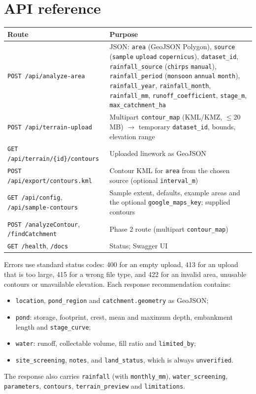 \documentclass[11pt,a4paper]{article}
\newcommand{\code}[1]{\texttt{#1}}
\begin{document}
\section{API reference}
\begin{tabularx}{\linewidth}{@{}L{60mm}Y@{}}
\toprule
\textbf{Route} & \textbf{Purpose}\\
\midrule
\code{POST /api/analyze-area} & JSON: \code{area} (GeoJSON Polygon), \code{source} (\code{sample} \textbar{} \code{upload} \textbar{} \code{copernicus}), \code{dataset\_id}, \code{rainfall\_source} (\code{chirps} \textbar{} \code{manual}), \code{rainfall\_period} (\code{monsoon} \textbar{} \code{annual} \textbar{} \code{month}), \code{rainfall\_year}, \code{rainfall\_month}, \code{rainfall\_mm}, \code{runoff\_coefficient}, \code{stage\_m}, \code{max\_catchment\_ha}\\
\code{POST /api/terrain-upload} & Multipart \code{contour\_map} (KML/KMZ, $\leq$20\,MB) $\rightarrow$ temporary \code{dataset\_id}, bounds, elevation range\\
\code{GET /api/terrain/\{id\}/contours} & Uploaded linework as GeoJSON\\
\code{POST /api/export/contours.kml} & Contour KML for \code{area} from the chosen source (optional \code{interval\_m})\\
\code{GET /api/config}, \code{/api/sample-contours} & Sample extent, defaults, example areas and the optional \code{google\_maps\_key}; supplied contours\\
\code{POST /analyzeContour}, \code{/findCatchment} & Phase 2 route (multipart \code{contour\_map})\\
\code{GET /health}, \code{/docs} & Status; Swagger UI\\
\bottomrule
\end{tabularx}

Errors use standard status codes: 400 for an empty upload, 413 for an upload that is too large, 415 for a wrong file type, and 422 for an invalid area, unusable contours or unavailable elevation. Each response recommendation contains:
\begin{itemize}
\item \code{location}, \code{pond\_region} and \code{catchment.geometry} as GeoJSON;
\item \code{pond}: storage, footprint, crest, mean and maximum depth, embankment length and \code{stage\_curve};
\item \code{water}: runoff, collectable volume, fill ratio and \code{limited\_by};
\item \code{site\_screening}, \code{notes}, and \code{land\_status}, which is always \code{unverified}.
\end{itemize}
The response also carries \code{rainfall} (with \code{monthly\_mm}), \code{water\_screening}, \code{parameters}, \code{contours}, \code{terrain\_preview} and \code{limitations}.
\end{document}
